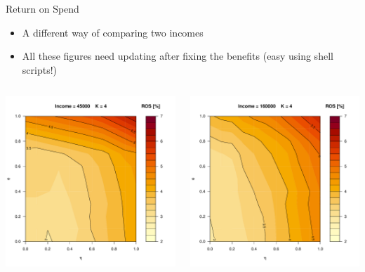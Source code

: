 \begin{frame}{Return on Spend}
    \begin{itemize}
        \item A different way of comparing two incomes
        \item All these figures need updating after fixing the benefits (easy using shell scripts!)
    \end{itemize}
    \begin{columns}[c]
        \begin{column}{0.5\textwidth}
            \includegraphics[width=1.1\textwidth]{../Figures/ROSvsEtaTheta_K5_Inc45k.pdf}
        \end{column}
        \begin{column}{0.5\textwidth}
            \includegraphics[width=1.1\textwidth]{../Figures/ROSvsEtaTheta_K5_Inc160k.pdf}

\end{column}
\end{columns}
\end{frame}
